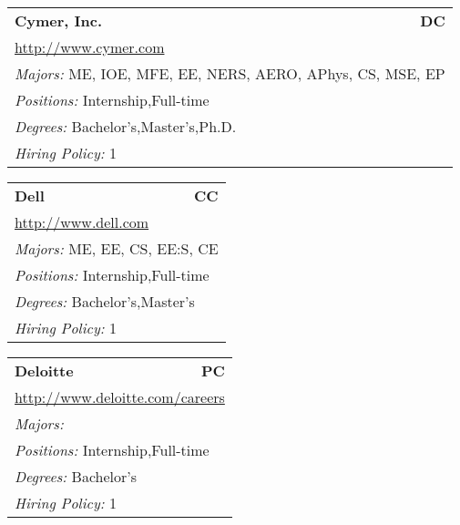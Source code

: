 \documentclass[twoside]{article}
\begin{document}
\begin{center}
\begin{multicols}{3}
\begin{FlushLeft}
\begin{minipage}{\columnwidth}
\end{minipage}
 
\begin{minipage}{\columnwidth}\begin{tabularx}{.95\columnwidth}{Xr}
                 {\Large\bf Cymer, Inc.} & {\Large\bf DC}\\
    \multicolumn{2}{p{.95\columnwidth}}{\url{http://www.cymer.com}}\\
    \multicolumn{2}{p{.95\columnwidth}}{\emph{Majors:} ME, IOE, MFE, EE, NERS, AERO, APhys, CS, MSE, EP}\\
    \multicolumn{2}{p{.95\columnwidth}}{\emph{Positions:} Internship,Full-time}\\
    \multicolumn{2}{p{.95\columnwidth}}{\emph{Degrees:} Bachelor's,Master's,Ph.D.}\\
    \multicolumn{2}{p{.95\columnwidth}}{\emph{Hiring Policy:} 1}\\
    \end{tabularx}
    
\end{minipage}
 
\begin{minipage}{\columnwidth}\begin{tabularx}{.95\columnwidth}{Xr}
                 {\Large\bf Dell} & {\Large\bf CC}\\
    \multicolumn{2}{p{.95\columnwidth}}{\url{http://www.dell.com}}\\
    \multicolumn{2}{p{.95\columnwidth}}{\emph{Majors:} ME, EE, CS, EE:S, CE}\\
    \multicolumn{2}{p{.95\columnwidth}}{\emph{Positions:} Internship,Full-time}\\
    \multicolumn{2}{p{.95\columnwidth}}{\emph{Degrees:} Bachelor's,Master's}\\
    \multicolumn{2}{p{.95\columnwidth}}{\emph{Hiring Policy:} 1}\\
    \end{tabularx}
    
\end{minipage}
 
\begin{minipage}{\columnwidth}\begin{tabularx}{.95\columnwidth}{Xr}
                 {\Large\bf Deloitte} & {\Large\bf PC}\\
    \multicolumn{2}{p{.95\columnwidth}}{\url{http://www.deloitte.com/careers}}\\
    \multicolumn{2}{p{.95\columnwidth}}{\emph{Majors:} }\\
    \multicolumn{2}{p{.95\columnwidth}}{\emph{Positions:} Internship,Full-time}\\
    \multicolumn{2}{p{.95\columnwidth}}{\emph{Degrees:} Bachelor's}\\
    \multicolumn{2}{p{.95\columnwidth}}{\emph{Hiring Policy:} 1}\\
    \end{tabularx}
    

\end{minipage}
\end{FlushLeft}
\end{multicols}
\end{center}
\end{document}
